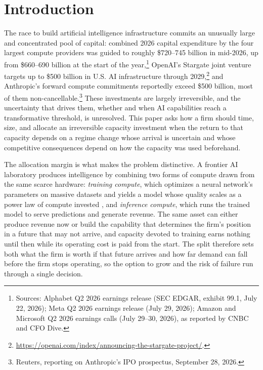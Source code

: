 \documentclass[
  11pt,
  letterpaper,
]{scrartcl}
\begin{document}
\section{Introduction}\label{sec-introduction}

The race to build artificial intelligence infrastructure commits an
unusually large and concentrated pool of capital: combined 2026 capital
expenditure by the four largest compute providers was guided to roughly
\$720--745 billion in mid-2026, up from \$660--690 billion at the start
of the year,\footnote{Sources: Alphabet Q2 2026 earnings release (SEC
  EDGAR, exhibit 99.1, July 22, 2026); Meta Q2 2026 earnings release
  (July 29, 2026); Amazon and Microsoft Q2 2026 earnings calls (July
  29--30, 2026), as reported by CNBC and CFO Dive.} OpenAI's Stargate
joint venture targets up to \$500 billion in U.S. AI infrastructure
through 2029,\footnote{\url{https://openai.com/index/announcing-the-stargate-project/}.}
and Anthropic's forward compute commitments reportedly exceed \$500
billion, most of them non-cancellable.\footnote{Reuters, reporting on
  Anthropic's IPO prospectus, September 28, 2026.} These investments are
largely irreversible, and the uncertainty that drives them, whether and
when AI capabilities reach a transformative threshold, is unresolved.
This paper asks how a firm should time, size, and allocate an
irreversible capacity investment when the return to that capacity
depends on a regime change whose arrival is uncertain and whose
competitive consequences depend on how the capacity was used beforehand.

The allocation margin is what makes the problem distinctive. A frontier
AI laboratory produces intelligence by combining two forms of compute
drawn from the same scarce hardware: \emph{training compute}, which
optimizes a neural network's parameters on massive datasets and yields a
model whose quality scales as a power law of compute invested
\citep{kaplan2020scaling, altman2025observations}, and \emph{inference
compute}, which runs the trained model to serve predictions and generate
revenue. The same asset can either produce revenue now or build the
capability that determines the firm's position in a future that may not
arrive, and capacity devoted to training earns nothing until then while
its operating cost is paid from the start. The split therefore sets both
what the firm is worth if that future arrives and how far demand can
fall before the firm stops operating, so the option to grow and the risk
of failure run through a single decision.
\end{document}
